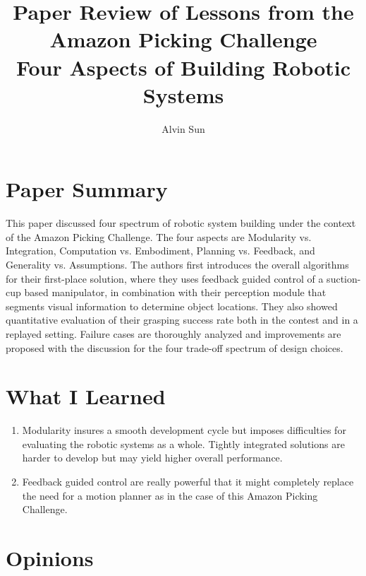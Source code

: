 \documentclass[10pt, twocolumn]{article}
\title{\vspace{-3.0em}Paper Review of Lessons from the Amazon Picking Challenge\\
       Four Aspects of Building Robotic Systems}
\author{Alvin Sun}
\begin{document}
\maketitle

\section{Paper Summary}
This paper discussed four spectrum of robotic system building under the context
of the Amazon Picking Challenge. The four aspects are Modularity vs. Integration,
Computation vs. Embodiment, Planning vs. Feedback, and Generality vs. Assumptions.
The authors first introduces the overall algorithms for their first-place
solution, where they uses feedback guided control of a suction-cup based
manipulator, in combination with their perception module that segments
visual information to determine object locations. They also showed quantitative
evaluation of their grasping success rate both in the contest and in a replayed
setting. Failure cases are thoroughly analyzed and improvements are proposed
with the discussion for the four trade-off spectrum of design choices.

\section{What I Learned}
\begin{enumerate}
  \item Modularity insures a smooth development cycle but imposes difficulties
    for evaluating the robotic systems as a whole. Tightly integrated solutions
    are harder to develop but may yield higher overall performance.

  \item Feedback guided control are really powerful that it might completely
    replace the need for a motion planner as in the case of this Amazon
    Picking Challenge.
\end{enumerate}

\section{Opinions}
\end{document}

